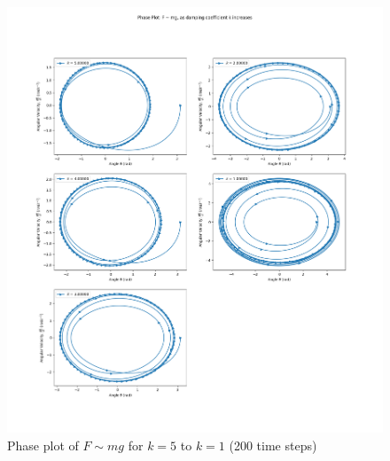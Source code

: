 \documentclass[10pt, twocolumn]{article}
\begin{document}
\begin{figure}
    \centering
    \includegraphics[width = \columnwidth]{Projects/ForcedSimplePendulum/Plots/Phase plot of F~mg as damping coefficient k increases from 5 to 1 (med).png}
    \caption{Phase plot of $F \sim{mg}$ for $k = 5$ to $k = 1$ (200 time steps)}
    \label{Phase plot of k 5 to 1 med}
\end{figure}
\end{document}
